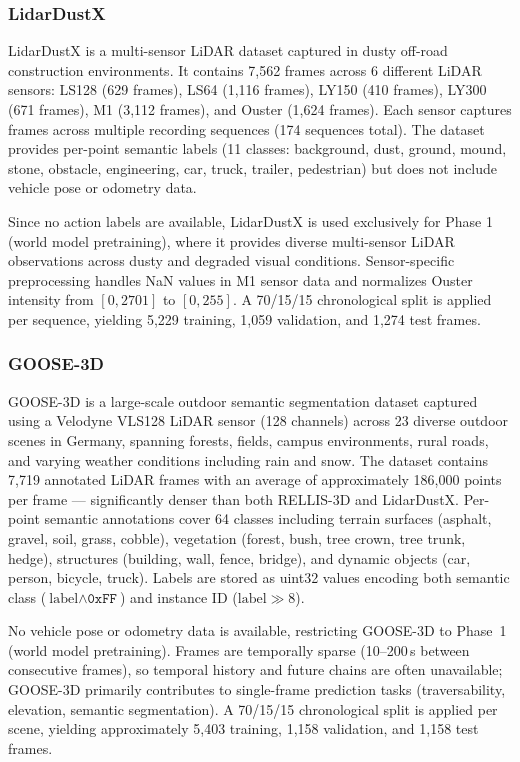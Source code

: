 \documentclass[journal]{IEEEtran}
\begin{document}
\subsubsection{LidarDustX}
LidarDustX \cite{lidardust} is a multi-sensor LiDAR dataset captured in dusty off-road construction environments. It contains 7,562 frames across 6 different LiDAR sensors: LS128 (629 frames), LS64 (1,116 frames), LY150 (410 frames), LY300 (671 frames), M1 (3,112 frames), and Ouster (1,624 frames). Each sensor captures frames across multiple recording sequences (174 sequences total). The dataset provides per-point semantic labels (11 classes: background, dust, ground, mound, stone, obstacle, engineering, car, truck, trailer, pedestrian) but does not include vehicle pose or odometry data.

Since no action labels are available, LidarDustX is used exclusively for Phase 1 (world model pretraining), where it provides diverse multi-sensor LiDAR observations across dusty and degraded visual conditions. Sensor-specific preprocessing handles NaN values in M1 sensor data and normalizes Ouster intensity from $[0, 2701]$ to $[0, 255]$. A 70/15/15 chronological split is applied per sequence, yielding 5,229 training, 1,059 validation, and 1,274 test frames.

\subsubsection{GOOSE-3D}
GOOSE-3D \cite{goose2024} is a large-scale outdoor semantic segmentation dataset captured using a Velodyne VLS128 LiDAR sensor (128 channels) across 23 diverse outdoor scenes in Germany, spanning forests, fields, campus environments, rural roads, and varying weather conditions including rain and snow. The dataset contains 7,719 annotated LiDAR frames with an average of approximately 186,000 points per frame --- significantly denser than both RELLIS-3D and LidarDustX. Per-point semantic annotations cover 64 classes including terrain surfaces (asphalt, gravel, soil, grass, cobble), vegetation (forest, bush, tree crown, tree trunk, hedge), structures (building, wall, fence, bridge), and dynamic objects (car, person, bicycle, truck). Labels are stored as uint32 values encoding both semantic class ($\text{label} \wedge \texttt{0xFF}$) and instance ID ($\text{label} \gg 8$).

No vehicle pose or odometry data is available, restricting GOOSE-3D to Phase~1 (world model pretraining). Frames are temporally sparse (10--200\,s between consecutive frames), so temporal history and future chains are often unavailable; GOOSE-3D primarily contributes to single-frame prediction tasks (traversability, elevation, semantic segmentation). A 70/15/15 chronological split is applied per scene, yielding approximately 5,403 training, 1,158 validation, and 1,158 test frames.
\end{document}
